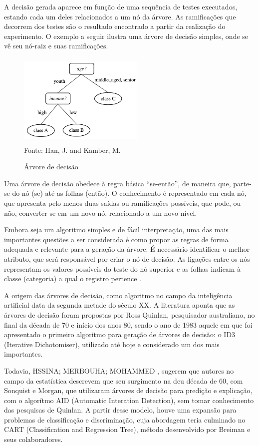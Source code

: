 A decisão gerada aparece em função de uma sequência de testes executados, estando cada um deles relacionados a um nó da árvore. As ramificações que decorrem dos testes são o resultado encontrado a partir da realização do experimento. 
O exemplo a seguir ilustra uma árvore de decisão simples, onde se vê seu nó-raiz e suas ramificações. 

\pagebreak

\begin{figure}[!ht]
	\centering
	\caption{Árvore de decisão}
	\includegraphics[width=60mm, height=45mm]{Figuras/Arvore/arvorejovem.png}\\
	\tiny Fonte: Han, J. and Kamber, M. 
\end{figure} 


Uma árvore de decisão obedece à regra básica “se-então”, de maneira que, parte-se do nó (se) até as folhas (então). O conhecimento é representado em cada nó, que apresenta pelo menos duas saídas ou ramificações possíveis, que pode, ou não, converter-se em um novo nó, relacionado a um novo nível. 

Embora seja um algoritmo simples e de fácil interpretação, uma das mais importantes questões a ser considerada é como propor as regras de forma adequada e relevante para a geração da árvore. É necessário identificar o melhor atributo, que será  responsável por criar o nó de decisão. As ligações entre os nós representam os valores possíveis do teste do nó superior e as folhas indicam à classe (categoria) a qual o registro pertence \cite{Camilo}.

A origem das árvores de decisão, como algoritmo no campo da inteligência artificial data da segunda metade do século XX. A literatura aponta que as árvores de decisão foram propostas por Ross Quinlan, pesquisador australiano, no final da década de 70 e início dos anos 80, sendo o ano de 1983 aquele em que foi apresentado o primeiro algoritmo para geração de árvores de decisão: o ID3 (Iterative Dichotomiser),  utilizado até hoje e considerado um dos mais importantes.  

Todavia, HSSINA; MERBOUHA; MOHAMMED \cite{Decision2014}, sugerem que autores no campo da estatística descrevem que seu surgimento na deu década de 60, com Sonquist e Morgan, que utilizaram árvores de decisão para predição e explicação, com o algorítmo AID (Automatic Interation Detection), sem tomar conhecimento das pesquisas de Quinlan. A partir desse modelo, houve uma expansão para problemas de classificação e discriminação, cuja abordagem teria culminado no CART (Classification and Regression Tree), método desenvolvido por Breiman e seus colaboradores.

